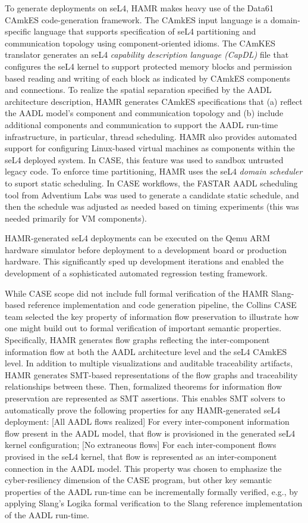 To generate deployments on seL4, HAMR makes heavy use of the Data61 CAmkES code-generation framework.   The CAmkES input language is a domain-specific language that supports specification of seL4 partitioning and communication topology using component-oriented idioms.  The CAmKES translator generates an seL4 \emph{capability description language (CapDL)} file that configures the seL4 kernel to support protected memory blocks and permission based reading and writing of each block as indicated by CAmkES components and connections.
To realize the spatial separation specified by the AADL architecture description, HAMR generates CAmkES specifications that (a) reflect the AADL model's component and communication topology and (b) include additional components and communication to support the AADL run-time infrastructure, in particular, thread scheduling.
HAMR also provides automated support for configuring Linux-based virtual machines as components within the seL4 deployed system.  In CASE, this feature was used to sandbox untrusted legacy code.
To enforce time partitioning, HAMR uses the seL4 \emph{domain scheduler} to suport static scheduling.  In CASE workflows, the FASTAR AADL scheduling tool from Adventium Labs was used to generate a candidate static schedule, and then the schedule was adjusted as needed based on timing experiments (this was needed primarily for VM components).

HAMR-generated seL4 deployments can be executed on the Qemu ARM hardware simulator before deployment to a development board or production hardware.  This significantly sped up development iterations and enabled the development of a sophisticated automated regression testing framework.

While CASE scope did not include full formal verification of the HAMR Slang-based reference implementation and code generation pipeline, the Collins CASE team selected the key property of information flow preservation to illustrate how one might build out to formal verification of important semantic properties.   Specifically, HAMR generates flow graphs reflecting the inter-component information flow at both the AADL architecture level and the seL4 CAmkES level.  In addition to multiple visualizations and auditable traceability artifacts, HAMR generates SMT-based representations of the flow graphs and traceability relationships between these.  Then, formalized theorems for information flow preservation are represented as SMT assertions.  This enables SMT solvers to automatically prove the following properties for any HAMR-generated seL4 deployment: [All AADL flows realized] For every inter-component information flow present in the AADL model, that flow is provisioned in the generated seL4 kernel configuration;  [No extraneous flows] For each inter-component flows provised in the seL4 kernel, that flow is represented as an inter-component connection in the AADL model.   This property was chosen to emphasize the cyber-resiliency dimension of the CASE program, but other key semantic properties of the AADL run-time can be incrementally formally verified, e.g., by applying Slang's Logika formal verification to the Slang reference implementation of the AADL run-time.  

